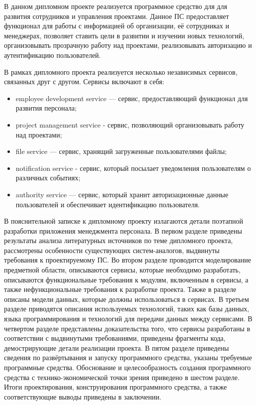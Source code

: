 В данном дипломном проекте реализуется программное средство для для развития сотрудников и управления проектами. Данное ПС предоставляет функционал для работы с информацией об организации, её сотрудниках и менеджерах, позволяет ставить цели в развитии и изучении новых технологий, организовывать прозрачную работу над проектами, реализовывать авторизацию и аутентификацию пользователей.

В рамках дипломного проекта реализуется несколько независимых сервисов, связанных друг с другом. Сервисы включают в себя:
\begin{itemize}
    \item employee development service — сервис, предоставляющий функционал для развития персонала;
    \item project management service - сервис, позволяющий организовывать работу над проектами;
    \item file service — сервис, хранящий загруженные пользователями файлы;
    \item notification service - сервис, который посылает уведомления пользователям о различных событиях;
    \item authority service — сервис, который хранит авторизационные данные пользователей и обеспечивает идентификацию пользователя.
\end{itemize}

В пояснительной записке к дипломному проекту излагаются детали поэтапной разработки приложения менеджмента персонала. В первом разделе приведены результаты анализа литературных источников по теме дипломного проекта, рассмотрены особенности существующих систем-ана\-логов, выдвинуты требования к проектируемому ПС. Во втором разделе проводится моделирование предметной области, описываются сервисы, которые необходимо разработать, описываются функциональные требования к модулям, включенным в сервисы, а также нефункциональные требования к разработке проекта. Также в разделе описаны модели данных, которые должны использоваться в сервисах. В третьем разделе приводятся описания используемых технологий, таких как базы данных, языка программирования и технологий для передачи данных между сервисами. В четвертом разделе представлены доказательства того, что сервисы разработаны в соответствии с выдвинутыми требованиями, приведены фрагменты кода, демострирующие детали реализации проекта. В пятом разделе приведены сведения по развёртывания и запуску программного средства, указаны требуемые программные средства. Обоснование и целесообразность создания программного средства с технико-экономической точки зрения приведено в шестом разделе. Итоги проектирования, конструирования программного средства, а также соответствующие выводы приведены в заключении.
